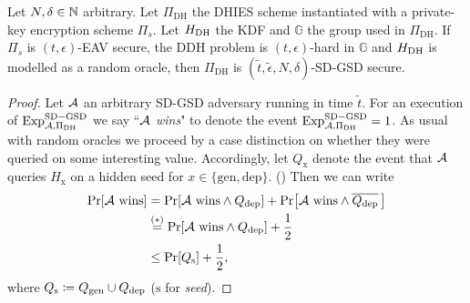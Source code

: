\begin{theorem} \label{theorem:sdgsd-security}
	Let $N, \delta \in \mathbb{N}$ arbitrary. Let $\Pi_{\mathrm{DH}}$ the DHIES scheme instantiated with a private-key encryption scheme $\Pi_s$. Let $H_\mathrm{DH}$ the KDF and $\mathbb{G}$ the group used in $\Pi_{\mathrm{DH}}$. If $\Pi_s$ is $(t, \epsilon)$-EAV secure, the DDH problem is $(t, \epsilon)$-hard in $\mathbb{G}$ and $H_\mathrm{DH}$ is modelled as a random oracle, then $\Pi_{\mathrm{DH}}$ is $(\tilde{t}, \tilde{\epsilon}, N, \delta)$-SD-GSD secure.
\end{theorem}
\begin{proof}
	Let $\mathcal{A}$ an arbitrary SD-GSD adversary running in time $\tilde{t}$. For an execution of $\mathrm{Exp}_{\mathcal{A}, \Pi_{\mathrm{DH}}}^{\mathrm{SD-GSD}}$ we say ``\emph{$\mathcal{A}$ wins}" to denote the event $\mathrm{Exp}_{\mathcal{A}, \Pi_{\mathrm{DH}}}^{\mathrm{SD-GSD}} = 1$.
	As usual with random oracles we proceed by a case distinction on whether they were queried on some interesting value. Accordingly, let $Q_{\mathrm{x}}$ denote the event that $\mathcal{A}$ queries $H_{\mathrm{x}}$ on a hidden seed for $x \in \{\mathrm{gen}, \mathrm{dep}\}$. () Then we can write
	\begin{align*}
		\pr{\wins} & = \pr{\wins \land \qdep} + \pr{\wins \land \overline{\qdep} \,} \\
		           & \stackrel{(*)}{=}  \pr{\wins \land \qdep} + \frac{1}{2}         \\
		           & \le \pr{\qs} + \frac{1}{2},
	\end{align*}
	where $Q_\mathrm{s} \coloneqq Q_\mathrm{gen} \cup Q_\mathrm{dep}$ ($\mathrm{s}$ for \emph{seed}).



\end{proof}
